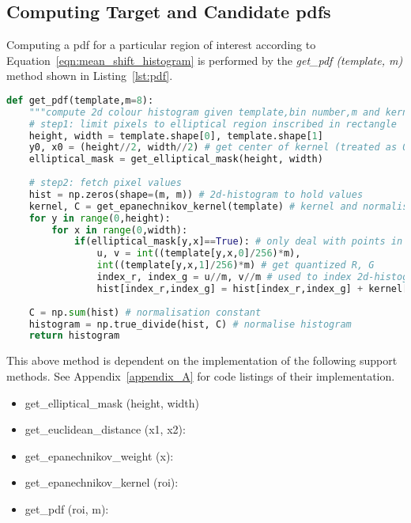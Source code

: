 \subsection{Computing Target and Candidate pdfs}
Computing a pdf for a particular region of interest according to 
Equation~\ref{eqn:mean_shift_histogram} is performed by the \textit{get\_pdf
(template, m)} method shown in Listing~\ref{lst:pdf}.

\begin{lstlisting}[language=Python, caption={Computing pdf}, captionpos=b, label={lst:pdf}]
def get_pdf(template,m=8):
    """compute 2d colour histogram given template,bin number,m and kernel function"""
    # step1: limit pixels to elliptical region inscribed in rectangle
    height, width = template.shape[0], template.shape[1]
    y0, x0 = (height//2, width//2) # get center of kernel (treated as 0,0) == hy and hx 
    elliptical_mask = get_elliptical_mask(height, width)
       
    # step2: fetch pixel values
    hist = np.zeros(shape=(m, m)) # 2d-histogram to hold values 
    kernel, C = get_epanechnikov_kernel(template) # kernel and normalisation constant, C
    for y in range(0,height):
        for x in range(0,width): 
            if(elliptical_mask[y,x]==True): # only deal with points in the mask
                u, v = int((template[y,x,0]/256)*m),
                int((template[y,x,1]/256)*m) # get quantized R, G
                index_r, index_g = u//m, v//m # used to index 2d-histogram
                hist[index_r,index_g] = hist[index_r,index_g] + kernel[y,x] # add weighted point
    
    C = np.sum(hist) # normalisation constant
    histogram = np.true_divide(hist, C) # normalise histogram
    return histogram 
\end{lstlisting}

This above method is dependent on the implementation of the following support
methods. See Appendix~\ref{appendix_A} for code listings of their implementation.
\begin{itemize}
    \item get\_elliptical\_mask (height, width)
    \item get\_euclidean\_distance (x1, x2):
    \item get\_epanechnikov\_weight (x):
    \item get\_epanechnikov\_kernel (roi):
    \item get\_pdf (roi, m):
\end{itemize}

